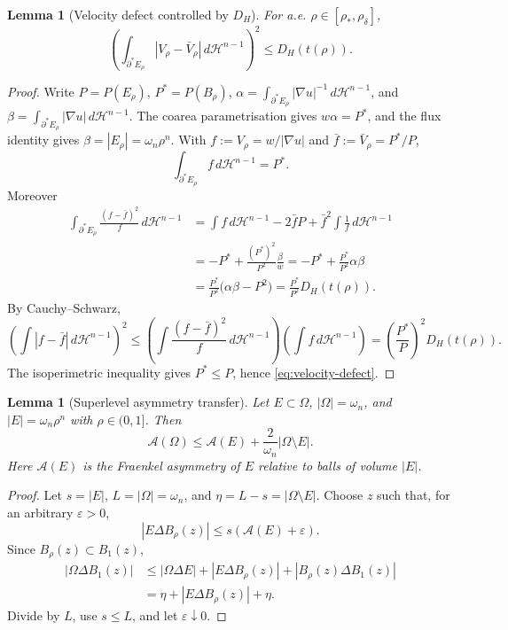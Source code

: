\documentclass[11pt]{amsart}
\newtheorem{lemma}[theorem]{Lemma}
\theoremstyle{definition}
\newcommand{\Om}{\Omega}
\newcommand{\Fr}{\mathcal A}
\newcommand{\rstar}{\rho_*}
\newcommand{\rdel}{\rho_\delta}
\newcommand{\wt}{w}
\newcommand{\eps}{\varepsilon}
\newcommand{\Hn}{\mathcal H^{n-1}}
\newcommand{\Per}{P}
\begin{document}
\begin{lemma}[Velocity defect controlled by \(D_H\)]\label{lem:velocity}
For a.e. \(\rho\in[\rstar,\rdel]\),
\begin{equation}\label{eq:velocity-defect}
   \left(
      \int_{\partial^*E_\rho}|V_\rho-\bar V_\rho|\,d\Hn
   \right)^2
   \le D_H(t(\rho)).
\end{equation}
\end{lemma}

\begin{proof}
Write \(P=\Per(E_\rho)\), \(P^*=\Per(B_\rho)\),
\(\alpha=\int_{\partial^*E_\rho}|\nabla u|^{-1}\,d\Hn\), and
\(\beta=\int_{\partial^*E_\rho}|\nabla u|\,d\Hn\).  The coarea
parametrisation gives \(\wt\alpha=P^*\), and the flux identity gives
\(\beta=|E_\rho|=\omega_n\rho^n\).  With
\(f:=V_\rho=\wt/|\nabla u|\) and \(\bar f:=\bar V_\rho=P^*/P\),
\[
   \int_{\partial^*E_\rho} f\,d\Hn=P^*.
\]
Moreover
\[
\begin{aligned}
   \int_{\partial^*E_\rho}\frac{(f-\bar f)^2}{f}\,d\Hn
   &=\int f\,d\Hn-2\bar f P+\bar f^2\int \frac1f\,d\Hn  \\
   &=-P^*+\frac{(P^*)^2}{P^2}\frac{\beta}{\wt}
    =-P^*+\frac{P^*}{P^2}\alpha\beta                 \\
   &=\frac{P^*}{P^2}\bigl(\alpha\beta-P^2\bigr)
    =\frac{P^*}{P^2}D_H(t(\rho)).
\end{aligned}
\]
By Cauchy--Schwarz,
\[
   \left(\int |f-\bar f|\,d\Hn\right)^2
   \le
   \left(\int\frac{(f-\bar f)^2}{f}\,d\Hn\right)
   \left(\int f\,d\Hn\right)
   =
   \left(\frac{P^*}{P}\right)^2D_H(t(\rho)).
\]
The isoperimetric inequality gives \(P^*\le P\), hence
\eqref{eq:velocity-defect}.
\end{proof}

\begin{lemma}[Superlevel asymmetry transfer]\label{lem:superlevel-transfer}
Let \(E\subset\Om\), \(|\Om|=\omega_n\), and \(|E|=\omega_n\rho^n\) with
\(\rho\in(0,1]\).  Then
\[
   \Fr(\Om)\le \Fr(E)+\frac{2}{\omega_n}|\Om\setminus E|.
\]
Here \(\Fr(E)\) is the Fraenkel asymmetry of \(E\) relative to balls of
volume \(|E|\).
\end{lemma}

\begin{proof}
Let \(s=|E|\), \(L=|\Om|=\omega_n\), and \(\eta=L-s=|\Om\setminus E|\).
Choose \(z\) such that, for an arbitrary \(\eps>0\),
\[
   |E\Delta B_\rho(z)|\le s(\Fr(E)+\eps).
\]
Since \(B_\rho(z)\subset B_1(z)\),
\[
\begin{aligned}
   |\Om\Delta B_1(z)|
   &\le |\Om\Delta E|+|E\Delta B_\rho(z)|+|B_\rho(z)\Delta B_1(z)|\\
   &=\eta+|E\Delta B_\rho(z)|+\eta .
\end{aligned}
\]
Divide by \(L\), use \(s\le L\), and let \(\eps\downarrow0\).
\end{proof}
\end{document}
